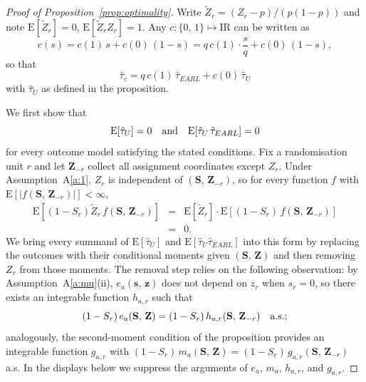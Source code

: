 \documentclass[sigconf]{acmart}
\newcommand{\E}{\mathrm E}
\newcommand{\R}{\mathrm{I}\!\mathrm{R}}
\newcommand{\nn}{\nonumber}
\begin{document}
\begin{proof}[Proof of Proposition~\ref{prop:optimality}]
    Write $\tilde Z_r=(Z_r-p)/(p(1-p))$ and note $\E[\tilde Z_r]=0$, $\E[\tilde Z_rZ_r]=1$. Any $c\colon\{0,\,1\}\mapsto\R$ can be written as
    \begin{equation*}
        c(s) = c(1)\,s + c(0)\,(1-s) = q\,c(1)\cdot\frac sq + c(0)\,(1-s),
    \end{equation*}
    so that
    \begin{equation}\label{eq:c-decomp}
        \hat\tau_c = q\,c(1)\,\hat\tau_{EARL} + c(0)\,\hat\tau_U
    \end{equation}
    with $\hat\tau_U$ as defined in the proposition.

    We first show that
    \begin{equation}\label{eq:U-orth}
        \E[\hat\tau_U] = 0\quad\textup{and}\quad \E[\hat\tau_U\,\hat\tau_{EARL}] = 0
    \end{equation}
    for every outcome model satisfying the stated conditions. Fix a randomisation unit $r$ and let $\mathbf Z_{-r}$ collect all assignment coordinates except $Z_r$. Under Assumption~A\ref{a:1}, $Z_r$ is independent of $(\mathbf S,\,\mathbf Z_{-r})$, so for every function $f$ with $\E[|f(\mathbf S,\,\mathbf Z_{-r})|]<\infty$,
    \begin{eqnarray}\label{eq:kill-term}
        \E\left[(1-S_r)\tilde Z_r\, f(\mathbf S,\,\mathbf Z_{-r})\right] &=& \E[\tilde Z_r]\cdot\E\left[(1-S_r)\, f(\mathbf S,\,\mathbf Z_{-r})\right]\nn\\
        &=& 0.
    \end{eqnarray}
    We bring every summand of $\E[\hat\tau_U]$ and $\E[\hat\tau_U\hat\tau_{EARL}]$ into this form by replacing the outcomes with their conditional moments given $(\mathbf S,\,\mathbf Z)$ and then removing $Z_r$ from those moments. The removal step relies on the following observation: by Assumption~A\ref{a:mu}(ii), $e_a(\mathbf s,\,\mathbf z)$ does not depend on $z_r$ when $s_r=0$, so there exists an integrable function $h_{a,r}$ such that
    \begin{equation}\label{eq:h-subst}
        (1-S_r)\,e_a(\mathbf S,\,\mathbf Z) = (1-S_r)\,h_{a,r}(\mathbf S,\,\mathbf Z_{-r})\quad\textup{a.s.};
    \end{equation}
    analogously, the second-moment condition of the proposition provides an integrable function $g_{a,r}$ with $(1-S_r)\,m_a(\mathbf S,\,\mathbf Z) = (1-S_r)\,g_{a,r}(\mathbf S,\,\mathbf Z_{-r})$ a.s. In the displays below we suppress the arguments of $e_a$, $m_a$, $h_{a,r}$, and $g_{a,r}$.


\end{proof}
\end{document}
